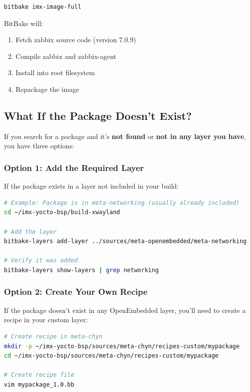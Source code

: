 \documentclass[12pt,a4paper]{report}
\begin{document}
\begin{lstlisting}[language=bash]
bitbake imx-image-full
\end{lstlisting}

BitBake will:
\begin{enumerate}
    \item Fetch zabbix source code (version 7.0.9)
    \item Compile zabbix and zabbix-agent
    \item Install into root filesystem
    \item Repackage the image
\end{enumerate}

\subsection{What If the Package Doesn't Exist?}

If you search for a package and it's \textbf{not found} or \textbf{not in any layer you have}, you have three options:

\subsubsection{Option 1: Add the Required Layer}

If the package exists in a layer not included in your build:

\begin{lstlisting}[language=bash]
# Example: Package is in meta-networking (usually already included)
cd ~/imx-yocto-bsp/build-xwayland

# Add the layer
bitbake-layers add-layer ../sources/meta-openembedded/meta-networking

# Verify it was added
bitbake-layers show-layers | grep networking
\end{lstlisting}

\subsubsection{Option 2: Create Your Own Recipe}

If the package doesn't exist in any OpenEmbedded layer, you'll need to create a recipe in your custom layer:

\begin{lstlisting}[language=bash]
# Create recipe in meta-chyn
mkdir -p ~/imx-yocto-bsp/sources/meta-chyn/recipes-custom/mypackage
cd ~/imx-yocto-bsp/sources/meta-chyn/recipes-custom/mypackage

# Create recipe file
vim mypackage_1.0.bb
\end{lstlisting}
\end{document}
